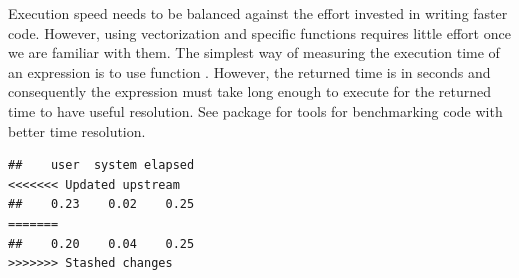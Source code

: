 \documentclass[krantz2]{krantz}\usepackage{knitr}
\begin{document}
Execution speed needs to be balanced against the effort invested in writing faster code. However, using vectorization and specific \Rlang functions requires little effort once we are familiar with them. The simplest way of measuring the execution time of an \Rlang expression is to use function . However, the returned time is in seconds and consequently the expression must take long enough to execute for the returned time to have useful resolution. See package  for tools for benchmarking code with better time resolution.

\begin{knitrout}\footnotesize
{}\color{fgcolor}\begin{kframe}
\begin{alltt}
 \hlkwb{<-} \hlstd{()}
               \hlopt{:}\hlstd{) \{}
               \hlkwb{<-}  \hlopt{/} 
              \hlstd{\}}
            \hlstd{\})}
\end{alltt}
\begin{verbatim}
##    user  system elapsed 
<<<<<<< Updated upstream
##    0.23    0.02    0.25
=======
##    0.20    0.04    0.25
>>>>>>> Stashed changes
\end{verbatim}
\end{kframe}
\end{knitrout}
\end{document}
